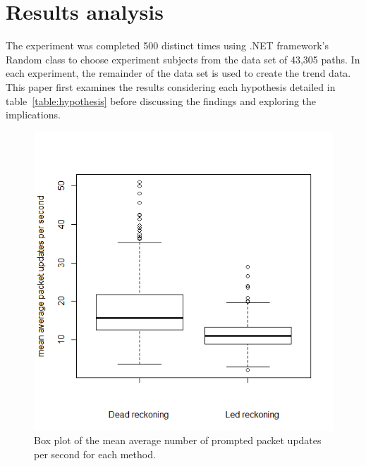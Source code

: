 \documentclass[journal]{IEEEtran}
\begin{document}
\section{Results analysis} \label{resultsanalysis}

The experiment was completed 500 distinct times using .NET framework's Random class to choose experiment subjects from the data set of 43,305 paths. In each experiment, the remainder of the data set is used to create the trend data. This paper first examines the results considering each hypothesis detailed in table~\ref{table:hypothesis} before discussing the findings and exploring the implications.

\begin{figure}[h]
    \centering
    \includegraphics[width=\linewidth]{FinalBoxplotPackets.png}
    \caption{Box plot of the mean average number of prompted packet updates per second for each method.}
    \label{fig:boxplotupdates}
\end{figure}
\end{document}
